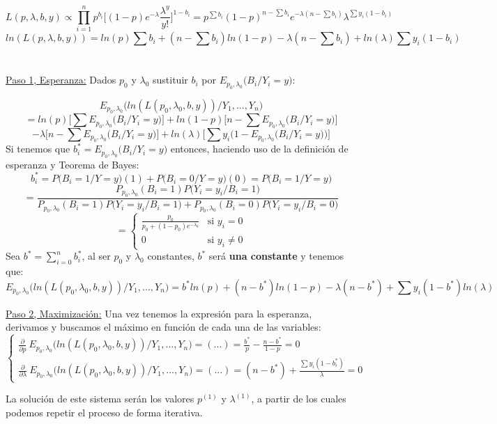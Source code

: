 $$L(p,\lambda,b,y)\propto\prod_{i=1}^{n}p^{b_i}\Big[(1-p)e^{-\lambda}\frac{\lambda^y}{y!}\Big]^{1-b_i}=p^{\sum b_i}(1-p)^{n-\sum b_i}e^{-\lambda(n-\sum b_i)}\lambda^{\sum y_i(1-b_i)}$$
$$ln(L(p,\lambda,b,y))=ln(p)\sum b_i+(n-\sum b_i)ln(1-p)-\lambda(n-\sum b_i)+ln(\lambda)\sum y_i(1-b_i)$$\\\ \\
\underline{Paso 1, Esperanza:} Dados $p_0$ y $\lambda_0$ sustituir $b_i$ por $E_{p_0,\lambda_0}\Big(B_i\Big/Y_i=y\Big)$:

$$E_{p_0,\lambda_0}\Big(ln(L(p_0,\lambda_0,b,y))\Big/Y_1,...,Y_n\Big)
$$
$$=ln(p)\Bigg[\sum E_{p_0,\lambda_0}\Big(B_i\Big/Y_i=y\Big)\Bigg]+ln(1-p)\Bigg[n-\sum E_{p_0,\lambda_0}\Big(B_i\Big/Y_i=y\Big)\Bigg]$$
$$-\lambda\Bigg[n-\sum E_{p_0,\lambda_0}\Big(B_i\Big/Y_i=y\Big)\Bigg]+ln(\lambda)\Bigg[\sum y_i\Big(1-E_{p_0,\lambda_0}\Big(B_i\Big/Y_i=y\Big)\Big)\Bigg]$$
Si tenemos que $b^*_i=E_{p_0,\lambda_0}\Big(B_i\Big/Y_i=y\Big)$ entonces, haciendo uso de la definición de esperanza y Teorema de Bayes:
$$b^*_i=P\Big(B_i=1\Big/Y=y\Big)(1)+P\Big(B_i=0\Big/Y=y\Big)(0)=P\Big(B_i=1\Big/Y=y\Big)$$
$$=\frac{P_{p_0,\lambda_0}(B_i=1)P\Big(Y_i=y_i\Big/B_i=1\Big)}{P_{p_0,\lambda_0}(B_i=1)P\Big(Y_i=y_i\Big/B_i=1\Big)+P_{p_0,\lambda_0}(B_i=0)P\Big(Y_i=y_i\Big/B_i=0\Big)}
$$
$$=\begin{cases}
    \frac{p_0}{p_0+(1-p_0)e^{-\lambda_0}} & \text{si } y_i=0 \\
    0 & \text{si }y_i \neq 0
\end{cases}$$
Sea $b^{*}=\sum_{i=0}^{n}b^{*}_i$, al ser $p_0$ y $\lambda_0$ constantes, $b^{*}$ será \textbf{una constante} y tenemos que:
$$E_{p_0,\lambda_0}\Big(ln(L(p_0,\lambda_0,b,y))\Big/Y_1,...,Y_n\Big)=b^{*}ln(p)+(n-b^{*})ln(1-p)-\lambda(n-b^{*})+\sum y_i(1-b^{*})ln(\lambda)$$

\noindent\underline{Paso 2, Maximización:} Una vez tenemos la expresión para la esperanza, derivamos y buscamos el máximo en función de cada una de las variables:
$$\begin{cases}
    \frac{\partial}{\partial p}\ E_{p_0,\lambda_0}\Big(ln(L(p_0,\lambda_0,b,y))\Big/Y_1,...,Y_n\Big)=(...)=\frac{b^{*}}{p}-\frac{n-b^{*}}{1-p}=0\\
    \frac{\partial}{\partial \lambda}\ E_{p_0,\lambda_0}\Big(ln(L(p_0,\lambda_0,b,y))\Big/Y_1,...,Y_n\Big)=(...)=(n-b^{*})+\frac{\sum y_i(1-b_i^{*})}{\lambda}=0
\end{cases}$$

La solución de este sistema serán los valores $p^{(1)}$ y $\lambda^{(1)}$, a partir de los cuales podemos repetir el proceso de forma iterativa.


